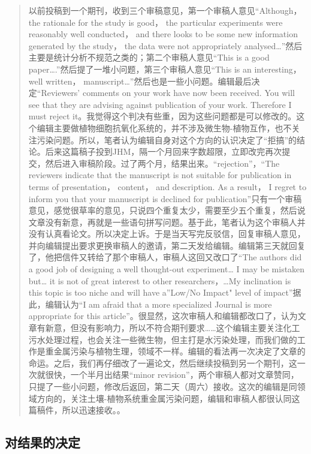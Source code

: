 \documentclass[
]{book}
\begin{document}
\begin{quote}
以前投稿到一个期刊，收到三个审稿意见，第一个审稿人意见``Although， the rationale for the study is good， the particular experiments were reasonably well conducted， and there looks to be some new information generated by the study， the data were not appropriately analysed\ldots{}''然后主要是统计分析不规范之类的；第二个审稿人意见``This is a good paper\ldots.''然后提了一堆小问题，第三个审稿人意见``This is an interesting， well written， manuscript\ldots{}''然后也是一些小问题。编辑最后决定``Reviewers' comments on your work have now been received. You will see that they are advising against publication of your work. Therefore I must reject it。我觉得这个判决有些重，因为这些问题都是可以修改的。这个编辑主要做植物细胞抗氧化系统的，并不涉及微生物-植物互作，也不关注污染问题。所以，笔者认为编辑自身对这个方向的认识决定了``拒搞''的结论。后来这篇稿子投到JHM，隔一个月回来字数超限，立即改完再次提交，然后进入审稿阶段。过了两个月，结果出来。``rejection''，``The reviewers indicate that the manuscript is not suitable for publication in terms of presentation， content， and description. As a result， I regret to inform you that your manuscript is declined for publication''只有一个审稿意见，感觉很草率的意见，只说四个重复太少，需要至少五个重复，然后说文章没有新意，再就是一些语句拼写问题。基于此，笔者认为这个审稿人并没有认真看论文。所以决定上诉。于是当天写完反驳信，回复审稿人意见，并向编辑提出要求更换审稿人的邀请，第二天发给编辑。编辑第三天就回复了，他把信件又转给了那个审稿人，审稿人这回又改口了``The authors did a good job of designing a well thought-out experiment\ldots{} I may be mistaken but\ldots{} it is not of great interest to other researchers，\ldots My inclination is this topic is too niche and will have a''Low/No Impact" level of impact''据此，编辑认为``I am afraid that a more specialized Journal is more appropriate for this article''。很显然，这次审稿人和编辑都改口了，认为文章有新意，但没有影响力，所以不符合期刊要求\ldots\ldots 这个编辑主要关注化工污水处理过程，也会关注一些微生物，但主打是水污染处理，而我们做的工作是重金属污染与植物生理，领域不一样。编辑的看法再一次决定了文章的命运。之后，我们再仔细改了一遍论文，然后继续投稿到另一个期刊，这一次就很快，一个半月出结果``minor revision''，两个审稿人都对文章赞同，只提了一些小问题，修改后返回，第二天（周六）接收。这次的编辑是同领域方向的，关注土壤-植物系统重金属污染问题，编辑和审稿人都很认同这篇稿件，所以迅速接收。。
\end{quote}

\hypertarget{ux5bf9ux7ed3ux679cux7684ux51b3ux5b9a}{%
\subsection{对结果的决定}\label{ux5bf9ux7ed3ux679cux7684ux51b3ux5b9a}}
\end{document}

